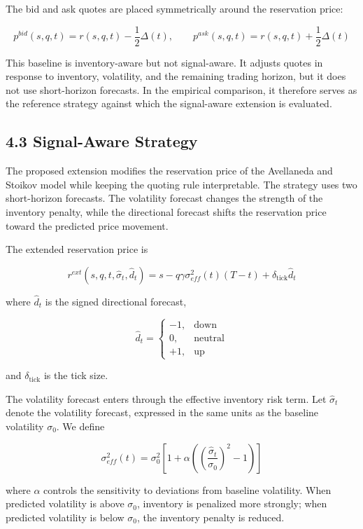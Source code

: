 \documentclass[12pt,a4paper]{article}
\begin{document}
The bid and ask quotes are placed symmetrically around the reservation
price:

\[
p^{bid}(s,q,t)=r(s,q,t)-\frac{1}{2}\Delta(t), \qquad p^{ask}(s,q,t)=r(s,q,t)+\frac{1}{2}\Delta(t)
\]

This baseline is inventory-aware but not signal-aware. It adjusts quotes
in response to inventory, volatility, and the remaining trading horizon,
but it does not use short-horizon forecasts. In the empirical
comparison, it therefore serves as the reference strategy against which
the signal-aware extension is evaluated.

\subsection{4.3 Signal-Aware Strategy}\label{signal-aware-strategy}

The proposed extension modifies the reservation price of the Avellaneda
and Stoikov model while keeping the quoting rule interpretable. The
strategy uses two short-horizon forecasts. The volatility forecast
changes the strength of the inventory penalty, while the directional
forecast shifts the reservation price toward the predicted price
movement.

The extended reservation price is

\[
r^{ext}(s,q,t,\hat{\sigma}_t,\hat{d}_t)=s-q\gamma\sigma^2_{eff}(t)(T-t)+\delta_{\text{tick}}\hat{d}_t
\]

where \(\hat{d}_t\) is the signed directional forecast,

\[
\hat{d}_t=\begin{cases}-1,&\text{down}\\0,&\text{neutral}\\+1,&\text{up}\end{cases}
\]

and \(\delta_{\text{tick}}\) is the tick size.

The volatility forecast enters through the effective inventory risk
term. Let \(\hat{\sigma}_t\) denote the volatility forecast, expressed
in the same units as the baseline volatility \(\sigma_0\). We define

\[
\sigma^2_{eff}(t)=\sigma_0^2\left[1+\alpha\left(\left(\frac{\hat{\sigma}_t}{\sigma_0}\right)^2-1\right)\right]
\]

where \(\alpha\) controls the sensitivity to deviations from baseline
volatility. When predicted volatility is above \(\sigma_0\), inventory
is penalized more strongly; when predicted volatility is below
\(\sigma_0\), the inventory penalty is reduced.
\end{document}
